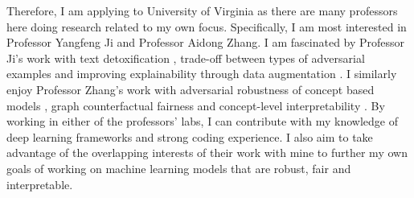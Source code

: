 \documentclass[10pt]{article}
\begin{document}
Therefore, I am applying to University of Virginia as there are many professors here doing research related to my own focus.
Specifically, I am most interested in Professor Yangfeng Ji and Professor Aidong Zhang.
I am fascinated by Professor Ji's work with text detoxification
\cite{wang2021simple}, trade-off between types of adversarial examples \cite{chen2022balanced} and improving explainability through data augmentation \cite{chen2019improving}.
I similarly enjoy Professor Zhang's work with adversarial robustness of concept based models \cite{sinha2022understanding}, graph counterfactual fairness \cite{ma2022learning} and concept-level interpretability \cite{yao2022concept}.
By working in either of the professors' labs, I can contribute with my knowledge of deep learning frameworks and strong coding experience.
I also aim to take advantage of the overlapping interests of their work with mine to further my own goals of working on machine learning models that are robust, fair and interpretable.





\end{document}
